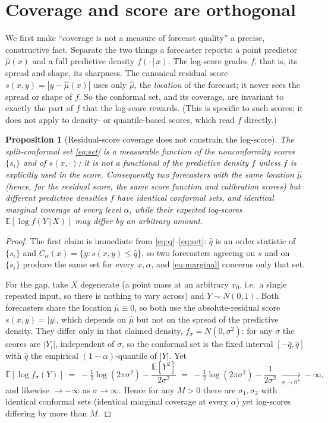 \documentclass[11pt]{article}
\newtheorem{proposition}{Proposition}
\theoremstyle{definition}
\newcommand{\E}{\mathbb{E}}
\newcommand{\given}{\,\vert\,}
\begin{document}
\section{Coverage and score are orthogonal}\label{sec:orthogonality}

We first make ``coverage is not a measure of forecast quality'' a precise, constructive
fact. Separate the two things a forecaster reports: a point predictor $\hat\mu(x)$ and a
full predictive density $f(\cdot\given x)$. The log-score grades $f$, that is, its spread
and shape, its sharpness. The canonical residual score $s(x,y)=|y-\hat\mu(x)|$ uses only
$\hat\mu$, the \emph{location} of the forecast; it never sees the spread or shape of $f$.
So the conformal set, and its coverage, are invariant to exactly the part of $f$ that the
log-score rewards. (This is specific to such scores; it does not apply to density- or
quantile-based scores, which read $f$ directly.)

\begin{proposition}[Residual-score coverage does not constrain the log-score]\label{prop:orth}
The split-conformal set \eqref{eq:set} is a measurable function of the nonconformity
scores $\{s_i\}$ and of $s(x,\cdot)$; it is not a functional of the predictive density
$f$ unless $f$ is explicitly used in the score. Consequently two forecasters with the
\emph{same} location $\hat\mu$ (hence, for the residual score, the same score function and
calibration scores) but different predictive densities $f$ have \emph{identical} conformal
sets, and identical marginal coverage at every level $\alpha$, while their expected
log-scores $\E[\log f(Y\given X)]$ may differ by an arbitrary amount.
\end{proposition}

\begin{proof}
The first claim is immediate from \eqref{eq:q}--\eqref{eq:set}: $\hat q$ is an order
statistic of $\{s_i\}$ and $C_\alpha(x)=\{y:s(x,y)\le\hat q\}$, so two forecasters
agreeing on $s$ and on $\{s_i\}$ produce the same set for every $x,\alpha$, and
\eqref{eq:marginal} concerns only that set.

For the gap, take $X$ degenerate (a point mass at an arbitrary $x_0$, i.e.\ a single
repeated input, so there is nothing to vary across) and $Y\sim N(0,1)$. Both forecasters
share the location
$\hat\mu\equiv 0$, so both use the absolute-residual score $s(x,y)=|y|$, which depends on
$\hat\mu$ but not on the spread of the predictive density. They differ only in that claimed
density, $f_\sigma=N(0,\sigma^2)$: for any $\sigma$ the scores are $|Y_i|$, independent of
$\sigma$, so the conformal set is the fixed interval $[-\hat q,\hat q]$ with $\hat q$ the
empirical $(1-\alpha)$-quantile of $|Y|$. Yet
\[
  \E[\log f_\sigma(Y)] \;=\; -\tfrac12\log(2\pi\sigma^2)-\frac{\E[Y^2]}{2\sigma^2}
  \;=\; -\tfrac12\log(2\pi\sigma^2)-\frac{1}{2\sigma^2}\;\xrightarrow[\sigma\to 0^+]{}-\infty,
\]
and likewise $\to-\infty$ as $\sigma\to\infty$. Hence for any $M>0$ there are
$\sigma_1,\sigma_2$ with identical conformal sets (identical marginal coverage at every
$\alpha$) yet log-scores differing by more than $M$.
\end{proof}
\end{document}
